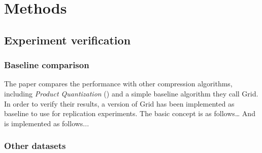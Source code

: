 \section{Methods}
\label{methods}

\subsection{Experiment verification}
\subsubsection{Baseline comparison}
The paper compares the \qs{} performance with other compression algorithms, including \textit{Product Quantization} (\pq{}) and a simple baseline algorithm they call Grid. In order to verify their results, a version of Grid has been implemented as baseline to use for replication experiments. The basic concept is as follows… And is implemented as follows...

\subsubsection{Other datasets}